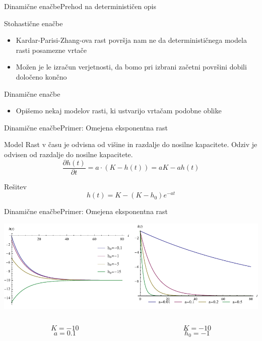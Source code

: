 \documentclass{beamer}
\begin{document}
\begin{frame}{Dinamične enačbe}{Prehod na determinističen opis}
\begin{block}{Stohastične enačbe}
  \begin{itemize}
  \item
    Kardar-Parisi-Zhang-ova rast površja nam ne da determinističnega modela rasti posamezne vrtače
  \item
    Možen je le izračun verjetnosti, da bomo pri izbrani začetni površini dobili določeno končno
  \end{itemize}
\end{block}
\begin{block}{Dinamične enačbe}
  \begin{itemize}
  \item
    Opišemo nekaj modelov rasti, ki ustvarijo vrtačam podobne oblike
  \end{itemize}
\end{block}
\end{frame}


\begin{frame}{Dinamične enačbe}{Primer: Omejena eksponentna rast}
\begin{block}{Model}
  Rast v času je odvisna od višine in razdalje do nosilne kapacitete. Odziv je odvisen od razdalje do nosilne kapacitete.
  \begin{equation} \frac{\partial h(t)}{\partial t} = a \cdot ( K - h(t) ) = a K - a h(t) \end{equation}
\end{block}
\begin{block}{Rešitev}
  \begin{equation} h(t) = K - (K - h_0) e^{-a t} \end{equation}
\end{block}
\end{frame}

\begin{frame}{Dinamične enačbe}{Primer: Omejena eksponentna rast}
\begin{center}
  \hspace*{-0.09\textwidth}\includegraphics[width=1.2\textwidth]{slike/omejena-eksponentna-rast}
  \footnotesize
\begin{columns}
  \begin{column}{0.5\textwidth}
  \[ K = -10 \]
  \[ a = 0.1 \]
  \end{column}
  \begin{column}{0.5\textwidth}
  \[ K = -10 \]
  \[ h_0 =-1 \]
  \end{column}
\end{columns}
\end{center}
\end{frame}
\end{document}
